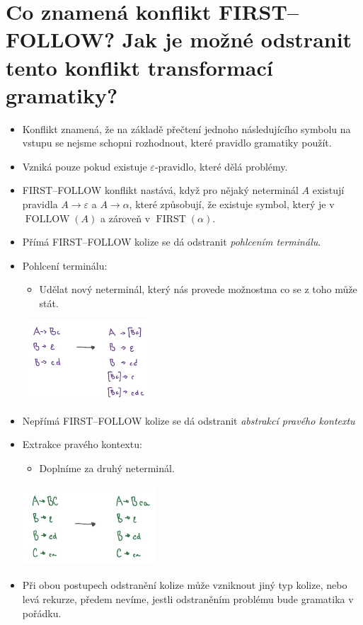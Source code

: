 \documentclass{article}
\begin{document}
\section{Co znamená konflikt FIRST–FOLLOW? Jak je možné odstranit tento konflikt transformací gramatiky?}
\begin{itemize}
  \item Konflikt znamená, že na základě přečtení jednoho následujícího symbolu na vstupu se nejsme schopni rozhodnout, které pravidlo gramatiky použít.
  \item Vzniká pouze pokud existuje $\varepsilon$-pravidlo, které dělá problémy.
  \item FIRST–FOLLOW konflikt nastává, když pro nějaký neterminál $A$ existují pravidla $A \rightarrow \varepsilon$ a $A \rightarrow \alpha$, které způsobují, že existuje symbol, který je v $\operatorname{FOLLOW}(A)$ a zároveň v $\operatorname{FIRST}(\alpha)$.
  \item Přímá FIRST–FOLLOW kolize se dá odstranit \emph{pohlcením terminálu}.
 
  \item Pohlcení terminálu:
  \begin{itemize}
      \item Udělat nový neterminál, který nás provede možnostma co se z toho může stát.
  \end{itemize}
  \includegraphics[width=5cm, height=3cm]{pohlceni_terminalu.jpeg}
  \item Nepřímá FIRST–FOLLOW kolize se dá odstranit \emph{abstrakcí pravého kontextu}
  \item Extrakce pravého kontextu:
  \begin{itemize}
      \item Doplníme za druhý neterminál.
  \end{itemize}
  \includegraphics[width=5cm, height=3cm]{abstrakce_praveho_kontextu.jpeg}
  \item Při obou postupech odstranění kolize může vzniknout jiný typ kolize, nebo levá rekurze, předem nevíme, jestli odstraněním problému bude gramatika v pořádku.
\end{itemize}
\newpage
\end{document}
